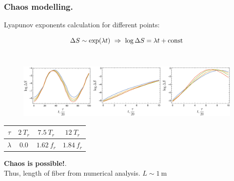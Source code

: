 \begin{frame}
	\frametitle{Chaos modelling.}
	Lyapunov exponents calculation for different points:
	
	$$\Delta S \sim \exp(\lambda t) \ \Rightarrow \ \log \Delta S = \lambda t + \const$$\\[5pt]
	
	\begin{figure}[h]
		\includegraphics[width=1.0\textwidth]{figures/lyapunovs.pdf}
	\end{figure}
	
	\begin{center}
			\begin{tabular}{c|c|c|c}
				$\tau$ & $2 \ T_r$ & $7.5 \ T_r$ & $12 \ T_r$ \\ \hline
				$\lambda$ & $0.0$ & $1.62 \ f_r$ & $1.84 \ f_r$
			\end{tabular}
	\end{center}
		
	\phantom{42}
	
	\textbf{Chaos is possible!}. \\
	Thus, length of fiber from numerical analysis. $L \sim 1 \ \text{m}$
	
\end{frame}